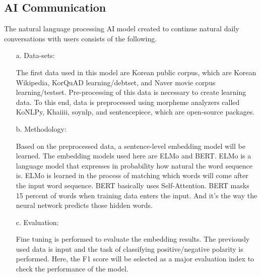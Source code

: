 \documentclass[conference]{IEEEtran}
\begin{document}
\subsection{AI Communication}
The natural language processing AI model created to continue natural daily conversations with users consists of the following.
\begin{itemize}
    \item[a.]Data-sets:
    \item[]The first data used in this model are Korean public corpus, which are Korean Wikipedia, KorQuAD learning/debtset, and Naver movie corpus learning/testset. Pre-processing of this data is necessary to create learning data. To this end, data is preprocessed using morpheme analyzers called KoNLPy, Khaiiii, soynlp, and sentencepiece, which are open-source packages.
    \item[b.]Methodology:
    \item[]Based on the preprocessed data, a sentence-level embedding model will be learned. The embedding models used here are ELMo and BERT. ELMo is a language model that expresses in probability how natural the word sequence is. ELMo is learned in the process of matching which words will come after the input word sequence. BERT basically uses Self-Attention. BERT masks 15 percent of words when training data enters the input. And it's the way the neural network predicts those hidden words.
    \item[c.]Evaluation:
    \item[]Fine tuning is performed to evaluate the embedding results. The previously used data is input and the task of classifying positive/negative polarity is performed. Here, the F1 score will be selected as a major evaluation index to check the performance of the model.
\end{itemize}
\end{document}
